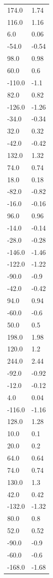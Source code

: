 \begin{longtable}{ll}
174.0 & 1.74 \\
116.0 & 1.16 \\
6.0 & 0.06 \\
-54.0 & -0.54 \\
98.0 & 0.98 \\
60.0 & 0.6 \\
-110.0 & -1.1 \\
82.0 & 0.82 \\
-126.0 & -1.26 \\
-34.0 & -0.34 \\
32.0 & 0.32 \\
-42.0 & -0.42 \\
132.0 & 1.32 \\
74.0 & 0.74 \\
18.0 & 0.18 \\
-82.0 & -0.82 \\
-16.0 & -0.16 \\
96.0 & 0.96 \\
-14.0 & -0.14 \\
-28.0 & -0.28 \\
-146.0 & -1.46 \\
-122.0 & -1.22 \\
-90.0 & -0.9 \\
-42.0 & -0.42 \\
94.0 & 0.94 \\
-60.0 & -0.6 \\
50.0 & 0.5 \\
198.0 & 1.98 \\
120.0 & 1.2 \\
244.0 & 2.44 \\
-92.0 & -0.92 \\
-12.0 & -0.12 \\
4.0 & 0.04 \\
-116.0 & -1.16 \\
128.0 & 1.28 \\
10.0 & 0.1 \\
20.0 & 0.2 \\
64.0 & 0.64 \\
74.0 & 0.74 \\
130.0 & 1.3 \\
42.0 & 0.42 \\
-132.0 & -1.32 \\
80.0 & 0.8 \\
52.0 & 0.52 \\
-90.0 & -0.9 \\
-60.0 & -0.6 \\
-168.0 & -1.68 \\

\end{longtable}
